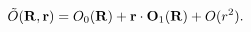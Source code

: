 \begin{equation}                      
\tilde{O}({\bf R}, {\bf r})= O_{0}({\bf R}) + {\bf r} \cdot{\bf O}_{1}({\bf R})                      
+O(r^{2}).                      
\end{equation} 
